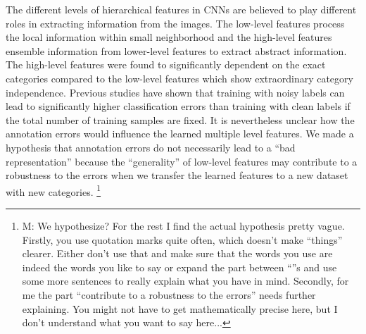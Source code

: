 \noindent
The different levels of hierarchical features in CNNs are believed to play different roles in extracting information from the images.
The low-level features process the local information within small neighborhood and the high-level features ensemble information from lower-level features to extract abstract information.
The high-level features were found to significantly dependent on the exact categories compared to the low-level features which show extraordinary category independence.\cite{yosinski2014transferable}
Previous studies\cite{sukhbaatar2014training,patrini2016making} have shown that training with noisy labels can lead to significantly higher classification errors than training with clean labels if the total number of training samples are fixed.
It is nevertheless unclear how the annotation errors would influence the learned multiple level features.
We made a hypothesis that annotation errors do not necessarily lead to a ``bad representation'' because the ``generality'' of low-level features may contribute to a robustness to the errors when we transfer the learned features to a new dataset with new categories.
\footnote{M: We hypothesize?
For the rest I find the actual hypothesis pretty vague.  Firstly, you use quotation marks quite often, which doesn't make ``things'' clearer.  Either don't use that and make sure that the words you use are indeed the words you like to say or expand the part between ``''s and use some more sentences to really explain what you have in  mind.  Secondly, for me the part ``contribute to a robustness to the errors'' needs further explaining.  You might not have to get mathematically precise here, but I don't understand what you want to say here...}


